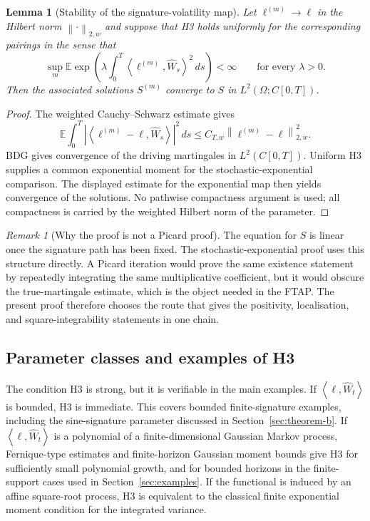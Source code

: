 \documentclass[11pt,oneside]{article}
\theoremstyle{plain}
\newtheorem{lemma}[theorem]{Lemma}
\theoremstyle{definition}
\theoremstyle{remark}
\newtheorem{remark}[theorem]{Remark}
\newcommand{\E}{\mathbb{E}}
\newcommand{\cW}{\widehat W}
\newcommand{\norm}[1]{\left\lVert #1\right\rVert}
\newcommand{\abs}[1]{\left\lvert #1\right\rvert}
\newcommand{\inner}[2]{\left\langle #1,#2\right\rangle}
\begin{document}
\begin{lemma}[Stability of the signature-volatility map]
\label{lem:parameter-stability}
Let $\ell^{(m)}\to\ell$ in the Hilbert norm $\norm{\cdot}_{2,w}$ and suppose that H3 holds uniformly for the corresponding pairings in the sense that
\[
\sup_m \E\exp\left(\lambda\int_0^T \inner{\ell^{(m)}}{\cW_s}^2\,ds\right)<\infty
\qquad\text{for every }\lambda>0.
\]
Then the associated solutions $S^{(m)}$ converge to $S$ in $L^2(\Omega;C[0,T])$.
\end{lemma}

\begin{proof}
The weighted Cauchy--Schwarz estimate gives
\[
\E\int_0^T \abs{\inner{\ell^{(m)}-\ell}{\cW_s}}^2\,ds
\leq C_{T,w}\norm{\ell^{(m)}-\ell}_{2,w}^2 .
\]
BDG gives convergence of the driving martingales in $L^2(C[0,T])$. Uniform H3 supplies a common exponential moment for the stochastic-exponential comparison. The displayed estimate for the exponential map then yields convergence of the solutions. No pathwise compactness argument is used; all compactness is carried by the weighted Hilbert norm of the parameter.
\end{proof}

\begin{remark}[Why the proof is not a Picard proof]
The equation for $S$ is linear once the signature path has been fixed. The stochastic-exponential proof uses this structure directly. A Picard iteration would prove the same existence statement by repeatedly integrating the same multiplicative coefficient, but it would obscure the true-martingale estimate, which is the object needed in the FTAP. The present proof therefore chooses the route that gives the positivity, localisation, and square-integrability statements in one chain.
\end{remark}


\subsection{Parameter classes and examples of H3}
\label{subsec:h3-classes}
The condition H3 is strong, but it is verifiable in the main examples. If $\inner{\ell}{\cW_t}$ is bounded, H3 is immediate. This covers bounded finite-signature examples, including the sine-signature parameter discussed in Section~\ref{sec:theorem-b}. If $\inner{\ell}{\cW_t}$ is a polynomial of a finite-dimensional Gaussian Markov process, Fernique-type estimates and finite-horizon Gaussian moment bounds give H3 for sufficiently small polynomial growth, and for bounded horizons in the finite-support cases used in Section~\ref{sec:examples}. If the functional is induced by an affine square-root process, H3 is equivalent to the classical finite exponential moment condition for the integrated variance.
\end{document}
